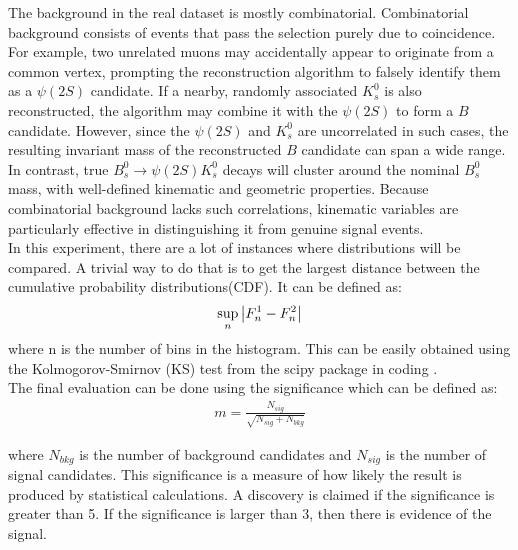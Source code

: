 The background in the real dataset is mostly combinatorial. Combinatorial background consists of events that pass the selection purely due to coincidence. For example, two unrelated muons may accidentally appear to originate from a common vertex, prompting the reconstruction algorithm to falsely identify them as a $\psi(2S)$ candidate. If a nearby, randomly associated $K_{s}^{0}$ is also reconstructed, the algorithm may combine it with the $\psi(2S)$ to form a $B$ candidate. However, since the $\psi(2S)$ and 
$K_{s}^{0}$
  are uncorrelated in such cases, the resulting invariant mass of the reconstructed $B$ candidate can span a wide range. In contrast, true $B_{s}^{0} \rightarrow \psi(2S)K_{s}^{0}$
  decays will cluster around the nominal 
$B_{s}^{0}$
  mass, with well-defined kinematic and geometric properties. Because combinatorial background lacks such correlations, kinematic variables are particularly effective in distinguishing it from genuine signal events.\\
  
 In this experiment, there are a lot of instances where distributions will be compared. A trivial way to do that is to get the largest distance between the cumulative probability distributions(CDF). It can be defined as:\\
$$\sup_{n}\abs{{F_{n}^{1} - F_{n}^{2}}}$$
where n is the number of bins in the histogram. This can be easily obtained using the Kolmogorov-Smirnov (KS) test from the scipy package in coding \cite{ks}.\\

The final evaluation can be done using the significance which can be defined as:\\
\begin{align}
    m = \frac{N_{sig}}{\sqrt{N_{sig} + N_{bkg}}}
    \label{proxy}
\end{align}

where $N_{bkg}$ is the number of background candidates and $N_{sig}$ is the number of signal candidates. This significance is a measure of how likely the result is produced by statistical calculations. A discovery is claimed if the significance is greater than 5. If the significance is larger than 3, then there is evidence of the signal.\\
